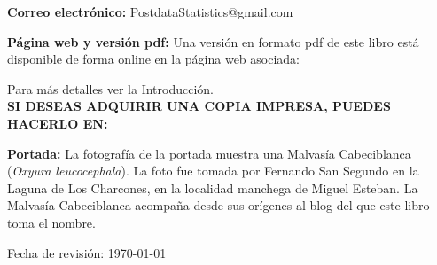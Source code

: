 \documentclass[10pt,a4paper]{book}
\begin{document}
	\vspace{2cm}
	\noindent
	{\bf Correo electrónico:} PostdataStatistics@gmail.com
	
	
	\noindent
	{\bf Página web y versión pdf:}
	Una versión en formato pdf de este libro está disponible de forma online
	en la página web asociada:
	\begin{center}
		\end{center}
		Para más detalles ver la Introducción.\\
		\textbf{SI DESEAS ADQUIRIR UNA COPIA IMPRESA, PUEDES HACERLO EN:  } 
	\begin{center}
						\end{center}
		
		
		
		\vfill
		
		\vspace{0.3cm}
		
		\noindent
		{\bf Portada:} La fotografía de la portada muestra una Malvasía Cabeciblanca ({\em Oxyura leucocephala}).
		La foto fue tomada por Fernando San Segundo en la Laguna de Los Charcones, en la
		localidad manchega de Miguel Esteban. La Malvasía Cabeciblanca acompaña desde
		sus orígenes al blog del que este libro toma el nombre. \\
		
		\vspace{1cm}
		
		\noindent Fecha de revisión: \today \\
		
		\normalsize
		
\end{document}
